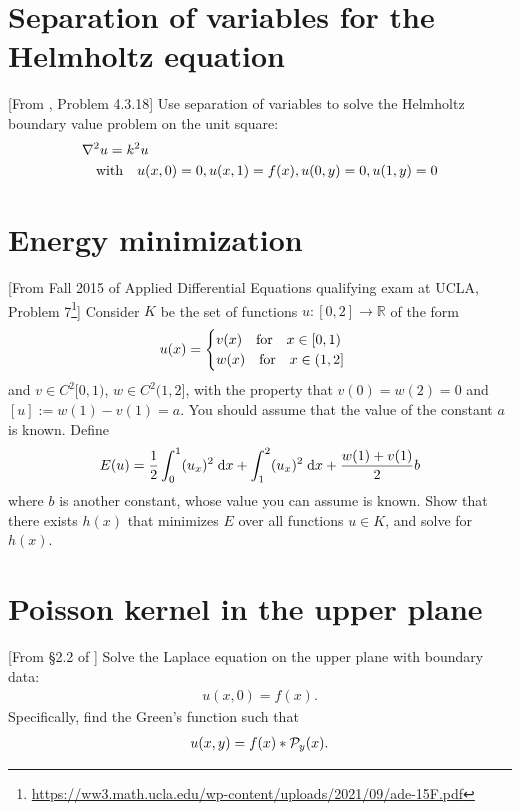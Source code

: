 \documentclass[11pt,letterpaper]{report}
\begin{document}
\section{Separation of variables for the Helmholtz equation}
[From \cite{Olver_14}, Problem 4.3.18] Use separation of variables to solve the Helmholtz boundary value problem on the unit square:
\begin{align}
    &\nabla^2 u = k^2u\\
    &\quad \mbox{with} \quad u(x,0)=0, u(x,1)=f(x), u(0, y) = 0, u(1, y) = 0
\end{align}

\section{Energy minimization}
[From Fall 2015 of Applied Differential Equations qualifying exam at UCLA, Problem 7\footnote{\url{https://ww3.math.ucla.edu/wp-content/uploads/2021/09/ade-15F.pdf}}] 
Consider $K$ be the set of functions $u: [0, 2] \to \mathbb{R}$ of the form 
\begin{align}
    u(x) = \begin{cases}
        v(x)\quad \mbox{for} \quad x\in[0,1)\\
        w(x)\quad \mbox{for} \quad x\in(1,2]
    \end{cases}
\end{align} 
and $v\in C^2[0,1)$, $w\in C^2(1,2]$, with the property that $v(0) = w(2) = 0$ and $[u] := w(1) - v(1) = a$. You should assume that the value of the constant $a$ is known. Define
\begin{align}
    E(u) = \frac{1}{2}\int_0^1 (u_x)^2\;\mathrm{d} x+\int^2_1 (u_x)^2\;\mathrm{d} x+\frac{w(1)+v(1)}{2}b
\end{align}
where $b$ is another constant, whose value you can assume is known. Show that there exists $h(x)$ that minimizes $E$ over all functions $u\in K$, and solve for $h(x)$.

\section{Poisson kernel in the upper plane}
[From \S2.2 of \cite{SteinShakarchi_03}] Solve the Laplace equation on the upper plane with boundary data:
\begin{align}
    u(x,0) = f(x).
\end{align}
Specifically, find the Green's function such that
\begin{align}
    u(x,y) = f(x)*\mathcal{P}_y(x).
\end{align}
\end{document}
